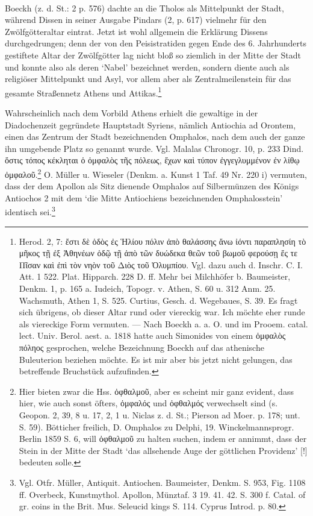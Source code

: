 \documentclass[a4paper, 11pt, oneside]{article}
\begin{document}
\paragraph{}
Boeckh (z. d. St.: 2 p. 576) dachte an die Tholos als Mittelpunkt der Stadt, während Dissen in seiner Ausgabe Pindars (2, p. 617) vielmehr für den Zwölfgötteraltar eintrat. Jetzt ist wohl allgemein die Erklärung Dissens durchgedrungen; denn der von den Peisistratiden gegen Ende des 6. Jahrhunderts gestiftete Altar der Zwölfgötter lag nicht bloß so ziemlich in der Mitte der Stadt und konnte also als deren `Nabel' bezeichnet werden, sondern diente auch als religiöser Mittelpunkt und Asyl, vor allem aber als Zentralmeilenstein für das gesamte Straßennetz Athens und Attikas.\footnote{Herod. 2, 7: ἔστι δὲ ὁδὸς ἐς Ἡλίου πόλιν ἀπὸ θαλάσσης ἄνω ἰόντι παραπλησίη τὸ μῆκος τῇ ἐξ Ἀθηνέων ὁδῷ τῇ ἀπὸ τῶν δυώδεκα θεῶν τοῦ βωμοῦ φερούσῃ ἔς τε Πῖσαν καὶ ἐπὶ τὸν νηὸν τοῦ Διὸς τοῦ Ὀλυμπίου. Vgl. dazu auch d. Inschr. C. I. Att. 1 522. Plat. Hipparch. 228 D. ff. Mehr bei Milchhöfer b. Baumeister, Denkm. 1, p. 165 a. Iudeich, Topogr. v. Athen, S. 60 u. 312 Anm. 25. Wachsmuth, Athen 1, S. 525. Curtius, Gesch. d. Wegebaues, S. 39. Es fragt sich übrigens, ob dieser Altar rund oder viereckig war. Ich möchte eher runde als viereckige Form vermuten. --- Nach Boeckh a. a. O. und im Prooem. catal. lect. Univ. Berol. aest. a. 1818 hatte auch Simonides von einem ὀμφαλὸς πόληος gesprochen, welche Bezeichnung Boeckh auf das athenische Buleuterion beziehen möchte. Es ist mir aber bis jetzt nicht gelungen, das betreffende Bruchstück aufzufinden.}

Wahrscheinlich nach dem Vorbild Athens erhielt die gewaltige in der Diadochenzeit gegründete Hauptstadt Syriens, nämlich Antiochia ad Orontem, einen das Zentrum der Stadt bezeichnenden Omphalos, nach dem auch der ganze ihn umgebende Platz so genannt wurde. Vgl. Malalas Chronogr. 10, p. 233 Dind. ὅστις τόπος κέκληται ὁ ὀμφαλὸς τῆς πόλεως, ἔχων καὶ τύπον ἐγγεγλυμμένον ἐν λίθῳ ὀμφαλοῦ.\footnote{Hier bieten zwar die Hss. ὀφθαλμοῦ, aber es scheint mir ganz evident, dass hier, wie auch sonst öfters, ὀμφαλός und ὀφθαλμός verwechselt sind (s. Geopon. 2, 39, 8 u. 17, 2, 1 u. Niclas z. d. St.; Pierson ad Moer. p. 178; unt. S. 59). Bötticher freilich, D. Omphalos zu Delphi, 19. Winckelmannsprogr. Berlin 1859 S. 6, will ὀφθαλμοῦ zu halten suchen, indem er annimmt, dass der Stein in der Mitte der Stadt `das allsehende Auge der göttlichen Providenz' [!] bedeuten solle.} O. Müller u. Wieseler (Denkm. a. Kunst 1 Taf. 49 Nr. 220 i) vermuten, dass der dem Apollon als Sitz dienende Omphalos auf Silbermünzen des Königs Antiochos 2 mit dem `die Mitte Antiochiens bezeichnenden Omphalosstein' identisch sei.\footnote{Vgl. Otfr. Müller, Antiquit. Antiochen. Baumeister, Denkm. S. 953, Fig. 1108 ff. Overbeck, Kunstmythol. Apollon, Münztaf. 3 19. 41. 42. S. 300 f. Catal. of gr. coins in the Brit. Mus. Seleucid kings S. 114. Cyprus Introd. p. 80.}
\end{document}
